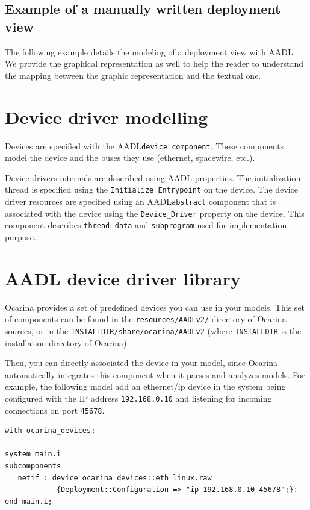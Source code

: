 \documentclass[11pt]{book}
\newcommand{\Concept}[1]{#1\xspace}
\newcommand{\aadl}{\Concept{AADL}}
\begin{document}
      \subsection{Example of a manually written deployment view}
      The following example details the modeling of a deployment view with AADL.
      We provide the graphical representation as well to help the reader to
      understand the mapping between the graphic representation and the textual
      one.

      \centerline{}

      


   \section{Device driver modelling}
   Devices are specified with the \aadl \texttt{device component}. These
   components model the device and the buses they use (ethernet, spacewire,
   etc.).
   
   Device drivers internals are described using \aadl properties. The
   initialization thread is specified using the
   \texttt{Initialize\_Entrypoint} on the device. The device driver resources
   are specified using an \aadl \texttt{abstract} component that is
   associated with the device using the \texttt{Device\_Driver} property on
   the device. This component describes \texttt{thread}, \texttt{data} and
   \texttt{subprogram} used for implementation purpose.

   \section{\aadl device driver library}
   Ocarina provides a set of predefined devices you can use in your models.
   This set of components can be found in the \texttt{resources/AADLv2/}
   directory of Ocarina sources, or in the
   \texttt{INSTALLDIR/share/ocarina/AADLv2} (where \texttt{INSTALLDIR} is the
   installation directory of Ocarina).

   Then, you can directly associated the device in your model, since Ocarina
   automatically integrates this component when it parses and analyzes
   models. For example, the following model add an ethernet/ip device in the
   system being configured with the IP address \texttt{192.168.0.10} and listening for
   incoming connections on port \texttt{45678}.

      \begin{lstlisting}[language=aadl]
with ocarina_devices;

system main.i
subcomponents
   netif : device ocarina_devices::eth_linux.raw
            {Deployment::Configuration => "ip 192.168.0.10 45678";}:
end main.i;
      \end{lstlisting}
\end{document}
